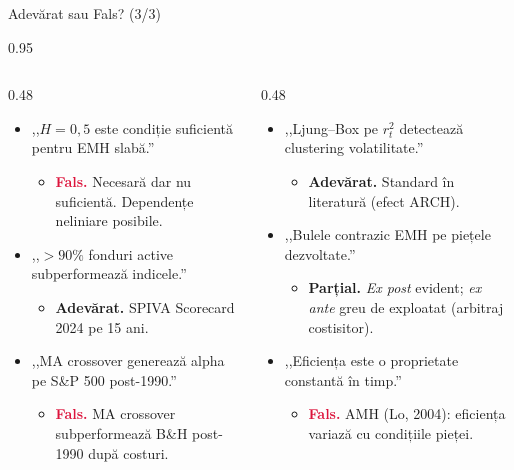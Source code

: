 \documentclass[9pt, aspectratio=169, t]{beamer}
\begin{document}
\begin{frame}[shrink=15]{Adevărat sau Fals? (3/3)}
\begin{cminipage}{0.95\textwidth}
\begin{columns}[T]
\begin{column}{0.48\textwidth}
\begin{itemize}\setlength{\itemsep}{1pt}
    \item ,,$H = 0{,}5$ este condiție suficientă pentru EMH slabă.''
    \begin{itemize}\setlength{\itemsep}{0pt}
        \item[] \textcolor{Crimson}{\textbf{Fals.}} Necesară dar nu suficientă. Dependențe neliniare posibile.
    \end{itemize}
    \item ,,$>90\%$ fonduri active subperformează indicele.''
    \begin{itemize}\setlength{\itemsep}{0pt}
        \item[] \textcolor{Forest}{\textbf{Adevărat.}} SPIVA Scorecard 2024 pe 15 ani.
    \end{itemize}
    \item ,,MA crossover generează alpha pe S\&P 500 post-1990.''
    \begin{itemize}\setlength{\itemsep}{0pt}
        \item[] \textcolor{Crimson}{\textbf{Fals.}} MA crossover subperformează B\&H post-1990 după costuri.
    \end{itemize}
\end{itemize}
\end{column}
\begin{column}{0.48\textwidth}
\begin{itemize}\setlength{\itemsep}{1pt}
    \item ,,Ljung--Box pe $r_t^2$ detectează clustering volatilitate.''
    \begin{itemize}\setlength{\itemsep}{0pt}
        \item[] \textcolor{Forest}{\textbf{Adevărat.}} Standard în literatură (efect ARCH).
    \end{itemize}
    \item ,,Bulele contrazic EMH pe piețele dezvoltate.''
    \begin{itemize}\setlength{\itemsep}{0pt}
        \item[] \textcolor{Amber}{\textbf{Parțial.}} \emph{Ex post} evident; \emph{ex ante} greu de exploatat (arbitraj costisitor).
    \end{itemize}
    \item ,,Eficiența este o proprietate constantă în timp.''
    \begin{itemize}\setlength{\itemsep}{0pt}
        \item[] \textcolor{Crimson}{\textbf{Fals.}} AMH (Lo, 2004): eficiența variază cu condițiile pieței.
    \end{itemize}
\end{itemize}
\end{column}
\end{columns}
\end{cminipage}
\end{frame}
\end{document}
